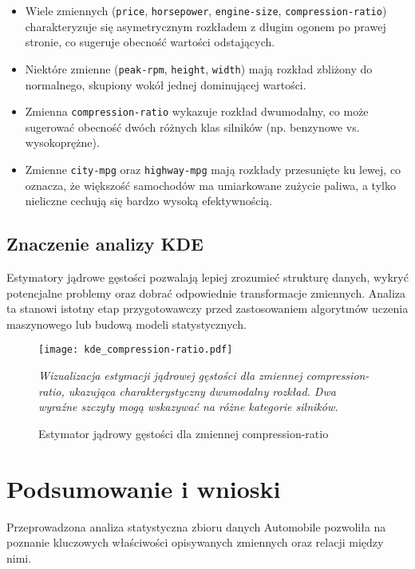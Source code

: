\documentclass[12pt,a4paper]{article}
\begin{document}
\begin{itemize}
    \item Wiele zmiennych (\texttt{price}, \texttt{horsepower}, \texttt{engine-size}, \texttt{compression-ratio}) charakteryzuje się asymetrycznym rozkładem z długim ogonem po prawej stronie, co sugeruje obecność wartości odstających.
    
    \item Niektóre zmienne (\texttt{peak-rpm}, \texttt{height}, \texttt{width}) mają rozkład zbliżony do normalnego, skupiony wokół jednej dominującej wartości.
    
    \item Zmienna \texttt{compression-ratio} wykazuje rozkład dwumodalny, co może sugerować obecność dwóch różnych klas silników (np. benzynowe vs. wysokoprężne).
    
    \item Zmienne \texttt{city-mpg} oraz \texttt{highway-mpg} mają rozkłady przesunięte ku lewej, co oznacza, że większość samochodów ma umiarkowane zużycie paliwa, a tylko nieliczne cechują się bardzo wysoką efektywnością.
\end{itemize}

\subsection{Znaczenie analizy KDE}

Estymatory jądrowe gęstości pozwalają lepiej zrozumieć strukturę danych, wykryć potencjalne problemy oraz dobrać odpowiednie transformacje zmiennych. Analiza ta stanowi istotny etap przygotowawczy przed zastosowaniem algorytmów uczenia maszynowego lub budową modeli statystycznych.

\begin{figure}[H]
    \centering
    \texttt{[image: kde\_compression-ratio.pdf]}
    \caption{Estymator jądrowy gęstości dla zmiennej compression-ratio}
    \label{fig:kde_compression_ratio}
    \small\textit{Wizualizacja estymacji jądrowej gęstości dla zmiennej compression-ratio, ukazująca charakterystyczny dwumodalny rozkład. Dwa wyraźne szczyty mogą wskazywać na różne kategorie silników.}
\end{figure}

\section{Podsumowanie i wnioski}

Przeprowadzona analiza statystyczna zbioru danych Automobile pozwoliła na poznanie kluczowych właściwości opisywanych zmiennych oraz relacji między nimi.
\end{document}
